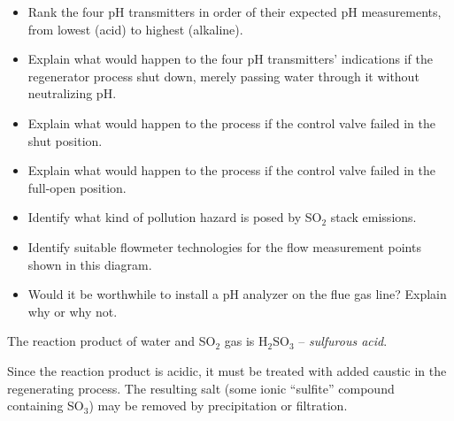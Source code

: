 \begin{itemize}
\item{} Rank the four pH transmitters in order of their expected pH measurements, from lowest (acid) to highest (alkaline).
\item{} Explain what would happen to the four pH transmitters' indications if the regenerator process shut down, merely passing water through it without neutralizing pH.
\item{} Explain what would happen to the process if the control valve failed in the shut position.
\item{} Explain what would happen to the process if the control valve failed in the full-open position.
\item{} Identify what kind of pollution hazard is posed by SO$_{2}$ stack emissions.
\item{} Identify suitable flowmeter technologies for the flow measurement points shown in this diagram.
\item{} Would it be worthwhile to install a pH analyzer on the flue gas line?  Explain why or why not.
\end{itemize}







The reaction product of water and SO$_{2}$ gas is H$_{2}$SO$_{3}$ -- {\it sulfurous acid}.







Since the reaction product is acidic, it must be treated with added caustic in the regenerating process.  The resulting salt (some ionic ``sulfite'' compound containing SO$_{3}$) may be removed by precipitation or filtration.





